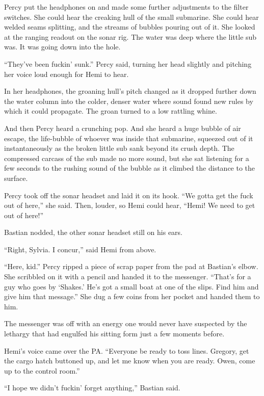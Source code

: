 \documentclass[
]{scrbook}
\begin{document}
Percy put the headphones on and made some further adjustments to the
filter switches. She could hear the creaking hull of the small
submarine. She could hear welded seams splitting, and the streams of
bubbles pouring out of it. She looked at the ranging readout on the
sonar rig. The water was deep where the little sub was. It was going
down into the hole.

``They've been fuckin' sunk.'' Percy said, turning her head slightly and
pitching her voice loud enough for Hemi to hear.

In her headphones, the groaning hull's pitch changed as it dropped
further down the water column into the colder, denser water where sound
found new rules by which it could propagate. The groan turned to a low
rattling whine.

And then Percy heard a crunching pop. And she heard a huge bubble of air
escape, the life-bubble of whoever was inside that submarine, squeezed
out of it instantaneously as the broken little sub sank beyond its crush
depth. The compressed carcass of the sub made no more sound, but she sat
listening for a few seconds to the rushing sound of the bubble as it
climbed the distance to the surface.

\bigskip

Percy took off the sonar headset and laid it on its hook. ``We gotta get
the fuck out of here,'' she said. Then, louder, so Hemi could hear,
``Hemi! We need to get out of here!''

Bastian nodded, the other sonar headset still on his ears.

``Right, Sylvia. I concur,'' said Hemi from above.

``Here, kid.'' Percy ripped a piece of scrap paper from the pad at
Bastian's elbow. She scribbled on it with a pencil and handed it to the
messenger. ``That's for a guy who goes by `Shakes.' He's got a small
boat at one of the slips. Find him and give him that message.'' She dug
a few coins from her pocket and handed them to him.

The messenger was off with an energy one would never have suspected by
the lethargy that had engulfed his sitting form just a few moments
before.

Hemi's voice came over the PA. ``Everyone be ready to toss lines.
Gregory, get the cargo hatch buttoned up, and let me know when you are
ready. Owen, come up to the control room.''

``I hope we didn't fuckin' forget anything,'' Bastian said.
\end{document}
